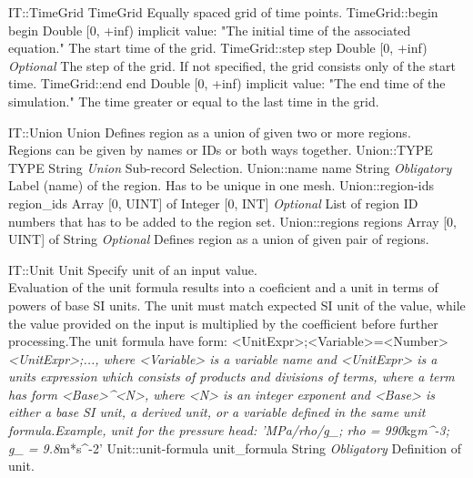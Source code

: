 \begin{RecordType}
	{IT::TimeGrid}
	{TimeGrid}
	{} %
	{} %
	{{{Equally spaced grid of time points.}}}
		\RecKey
			{TimeGrid::begin}
			{begin}
			{{Double [0, +inf)}}
			{implicit value: "{The initial time of the associated equation.}"}
			{{{The start time of the grid.}}}
		\RecKey
			{TimeGrid::step}
			{step}
			{{Double [0, +inf)}}
			{ \it{Optional} }
			{{{The step of the grid. If not specified, the grid consists only of the start time.}}}
		\RecKey
			{TimeGrid::end}
			{end}
			{{Double [0, +inf)}}
			{implicit value: "{The end time of the simulation.}"}
			{{{The time greater or equal to the last time in the grid.}}}
\end{RecordType}
\begin{RecordType}
	{IT::Union}
	{Union}
	{} %
	{} %
	{{{Defines region as a union of given two or more regions.}\\{
Regions can be given by names or IDs or both ways together.}}}
		\RecKey
			{Union::TYPE}
			{TYPE}
			{{String}}
			{ \it{Union} }
			{{{Sub-record Selection.}}}
		\RecKey
			{Union::name}
			{name}
			{{String}}
			{ \it{Obligatory} }
			{{{Label (name) of the region. Has to be unique in one mesh.}}}
		\RecKey
			{Union::region-ids}
			{region{\_}ids}
			{{Array [0, UINT] of }{Integer [0, INT]}}
			{ \it{Optional} }
			{{{List of region ID numbers that has to be added to the region set.}}}
		\RecKey
			{Union::regions}
			{regions}
			{{Array [0, UINT] of }{String}}
			{ \it{Optional} }
			{{{Defines region as a union of given pair of regions.}}}
\end{RecordType}
\begin{RecordType}
	{IT::Unit}
	{Unit}
	{} %
	{} %
	{{{Specify unit of an input value. }\\{
Evaluation of the unit formula results into a coeficient and a unit in terms of powers of base SI units. The unit must match expected SI unit of the value, while the value provided on the input is multiplied by the coefficient before further processing.The unit formula have form: {\textless}UnitExpr{\textgreater};{\textless}Variable{\textgreater}={\textless}Number{\textgreater}}\textit{{\textless}UnitExpr{\textgreater};..., where {\textless}Variable{\textgreater} is a variable name and {\textless}UnitExpr{\textgreater} is a units expression which consists of products and divisions of terms, where a term has form {\textless}Base{\textgreater}{\^{}}{\textless}N{\textgreater}, where {\textless}N{\textgreater} is an integer exponent and {\textless}Base{\textgreater} is either a base SI unit, a derived unit, or a variable defined in the same unit formula.Example, unit for the pressure head: 'MPa/rho/g{\_}; rho = 990}{kg}\textit{m{\^{}}-3; g{\_} = 9.8}{m*s{\^{}}-2'}}}
		\RecKey
			{Unit::unit-formula}
			{unit{\_}formula}
			{{String}}
			{ \it{Obligatory} }
			{{{Definition of unit.}}}
\end{RecordType}
